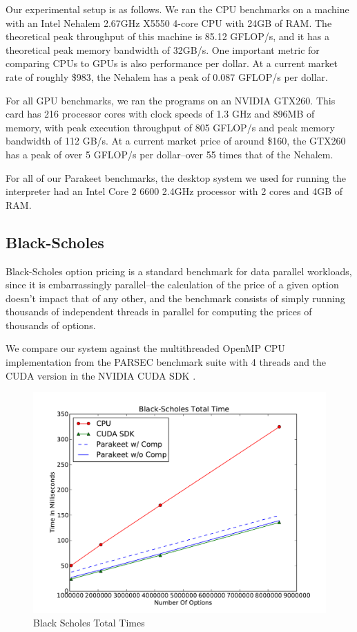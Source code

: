 \documentclass[preprint]{sigplanconf}
\begin{document}
Our experimental setup is as follows.  We ran the CPU benchmarks on a machine
with an Intel Nehalem 2.67GHz X5550 4-core CPU with 24GB of RAM.  The
theoretical peak throughput of this machine is 85.12 GFLOP/s, and it has a
theoretical peak memory bandwidth of 32GB/s.  One important metric for comparing
CPUs to GPUs is also performance per dollar.  At a current market rate of
roughly \$983, the Nehalem has a peak of 0.087 GFLOP/s per dollar.

For all GPU benchmarks, we ran the programs on an NVIDIA GTX260. This card
has 216 processor cores with clock speeds of 1.3 GHz and 896MB of memory, with
peak execution throughput of 805 GFLOP/s and peak memory bandwidth of 112 GB/s.
At a current market price of around \$160, the GTX260 has a peak of over 5
GFLOP/s per dollar--over 55 times that of the Nehalem.

For all of our Parakeet benchmarks, the desktop system we used for running the
interpreter  had an Intel Core 2 6600 2.4GHz processor with 2 cores and
4GB of RAM.

\subsection{Black-Scholes}
Black-Scholes option pricing \cite{Blac73} is a standard benchmark for data
parallel workloads, since it is embarrassingly parallel--the calculation of the
price of a given option doesn't impact that of any other, and the benchmark
consists of simply running thousands of independent threads in parallel for
computing the prices of thousands of options.

We compare our system against the multithreaded OpenMP CPU implementation
from the PARSEC \cite{Bien08} benchmark suite with 4 threads and the CUDA
version in the NVIDIA CUDA SDK \cite{NvidSD}.

\begin{figure}
\includegraphics[scale=0.45]{BSTotal.pdf}
\caption{Black Scholes Total Times}
\label{BSResults}
\end{figure}
\end{document}
